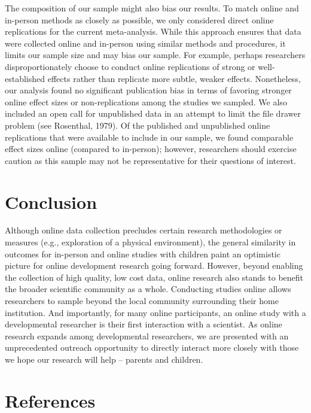 \documentclass[
  man,floatsintext]{apa6}
\begin{document}
The composition of our sample might also bias our results. To match online and in-person methods as closely as possible, we only considered direct online replications for the current meta-analysis. While this approach ensures that data were collected online and in-person using similar methods and procedures, it limits our sample size and may bias our sample. For example, perhaps researchers disproportionately choose to conduct online replications of strong or well-established effects rather than replicate more subtle, weaker effects. Nonetheless, our analysis found no significant publication bias in terms of favoring stronger online effect sizes or non-replications among the studies we sampled. We also included an open call for unpublished data in an attempt to limit the file drawer problem (see Rosenthal, 1979). Of the published and unpublished online replications that were available to include in our sample, we found comparable effect sizes online (compared to in-person); however, researchers should exercise caution as this sample may not be representative for their questions of interest.

\hypertarget{conclusion}{%
\section{Conclusion}\label{conclusion}}

Although online data collection precludes certain research methodologies or measures (e.g., exploration of a physical environment), the general similarity in outcomes for in-person and online studies with children paint an optimistic picture for online development research going forward. However, beyond enabling the collection of high quality, low cost data, online research also stands to benefit the broader scientific community as a whole. Conducting studies online allows researchers to sample beyond the local community surrounding their home institution. And importantly, for many online participants, an online study with a developmental researcher is their first interaction with a scientist. As online research expands among developmental researchers, we are presented with an unprecedented outreach opportunity to directly interact more closely with those we hope our research will help -- parents and children.

\newpage

\hypertarget{references}{%
\section{References}\label{references}}
\end{document}
